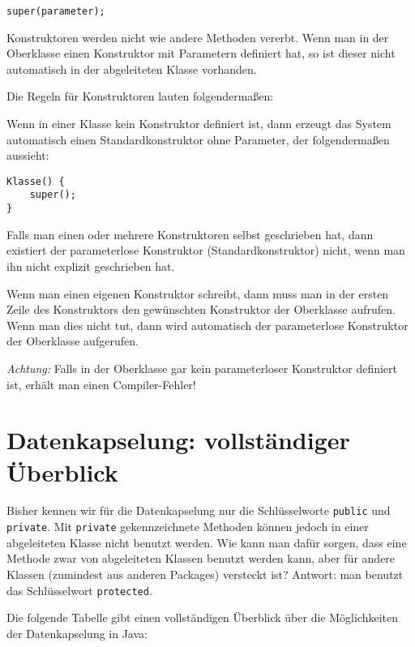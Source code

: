 \begin{lstlisting}
super(parameter);
\end{lstlisting}

Konstruktoren werden nicht wie andere Methoden vererbt. Wenn man in der
Oberklasse einen Konstruktor mit Parametern definiert hat, so ist dieser nicht
automatisch in der abgeleiteten Klasse vorhanden.

Die Regeln für Konstruktoren lauten folgendermaßen:

\begin{compactenum}[1.]
\item Wenn in einer Klasse kein Konstruktor definiert ist, dann erzeugt das
System automatisch einen Standardkonstruktor ohne Parameter, der folgendermaßen
aussieht:

\begin{lstlisting}
Klasse() {
    super();
}
\end{lstlisting}

\item Falls man einen oder mehrere Konstruktoren selbst geschrieben hat, dann
existiert der parameterlose Konstruktor (Standardkonstruktor) nicht, wenn man
ihn nicht explizit geschrieben hat.
\item Wenn man einen eigenen Konstruktor schreibt, dann muss man in der ersten
Zeile des Konstruktors den gewünschten Konstruktor der Oberklasse aufrufen.
Wenn man dies nicht tut, dann wird automatisch der parameterlose Konstruktor
der Oberklasse aufgerufen.

\emph{Achtung:} Falls in der Oberklasse gar kein parameterloser Konstruktor
definiert ist, erhält man einen Compiler-Fehler!
\end{compactenum}


\section{Datenkapselung: vollständiger Überblick}

Bisher kennen wir für die Datenkapselung nur die Schlüsselworte \verb|public|
und \verb|private|. Mit \verb|private| gekennzeichnete Methoden können jedoch in
einer abgeleiteten Klasse nicht benutzt werden. Wie kann man dafür sorgen, dass
eine Methode zwar von abgeleiteten Klassen benutzt werden kann, aber für andere
Klassen (zumindest aus anderen Packages) versteckt ist? Antwort: man benutzt
das Schlüsselwort \verb|protected|.

Die folgende Tabelle gibt einen vollständigen Überblick über die Möglichkeiten
der Datenkapselung in Java:

